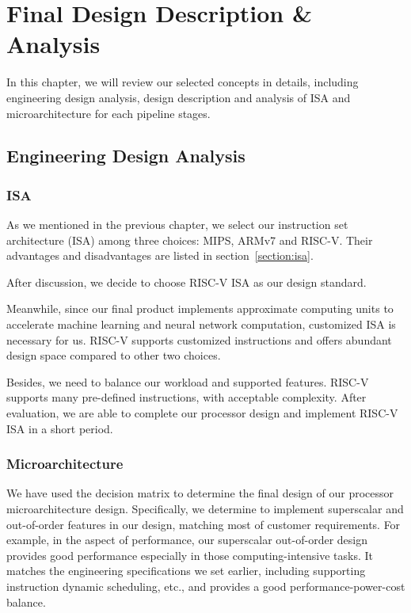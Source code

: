 
\let\clearpage\relax
\chapter{Final Design Description \& Analysis}

In this chapter, we will review our selected concepts in details, including engineering design analysis, design description and analysis of ISA and microarchitecture for each pipeline stages.

\section{Engineering Design Analysis}

\subsection{ISA} %
As we mentioned in the previous chapter, we select our instruction set architecture (ISA) among three choices: MIPS, ARMv7 and RISC-V. Their advantages and disadvantages are listed in section~\ref{section:isa}.

After discussion, we decide to choose RISC-V ISA as our design standard.

Meanwhile, since our final product implements approximate computing units to accelerate machine learning and neural network computation, customized ISA is necessary for us. RISC-V supports customized instructions and offers abundant design space compared to other two choices.

Besides, we need to balance our workload and supported features. RISC-V supports many pre-defined instructions, with acceptable complexity. After evaluation, we are able to complete our processor design and implement RISC-V ISA in a short period.

\subsection{Microarchitecture} \label{section：Microarchitecture} %
We have used the decision matrix to determine the final design of our processor microarchitecture design. Specifically, we determine to implement superscalar and out-of-order features in our design, matching most of customer requirements. For example, in the aspect of performance, our superscalar out-of-order design provides good performance especially in those computing-intensive tasks. It matches the engineering specifications we set earlier, including supporting instruction dynamic scheduling, etc., and provides a good performance-power-cost balance.

